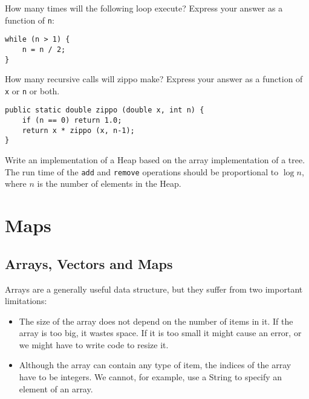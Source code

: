 \begin{exercise}
How many times will the following loop
execute?  Express your answer as a function of {\tt n}:

\begin{verbatim}
while (n > 1) {
    n = n / 2;
}
\end{verbatim}
\end{exercise}


\begin{exercise}
How many recursive calls will zippo make?  Express
your answer as a function of {\tt x} or {\tt n} or both.

\begin{verbatim}
public static double zippo (double x, int n) {
    if (n == 0) return 1.0;
    return x * zippo (x, n-1);
}
\end{verbatim}
\end{exercise}


\begin{exercise}
Write an implementation of a Heap based on the array implementation
of a tree.  The run time of the {\tt add} and {\tt remove} operations
should be proportional to $\log n$, where $n$ is the number of elements
in the Heap.
\end{exercise}



\beforechapter
\chapter{Maps}
\label{chap19}

\section {Arrays, Vectors and Maps}

Arrays are a generally useful data structure, but they suffer
from two important limitations:

\begin{itemize}

\item The size of the array does not depend on the number of
items in it.  If the array is too big, it wastes space.  If
it is too small it might cause an error, or we might have to
write code to resize it.

\item Although the array can contain any type of item, the
indices of the array have to be integers.  We cannot, for
example, use a String to specify an element of an array.

\end{itemize}

